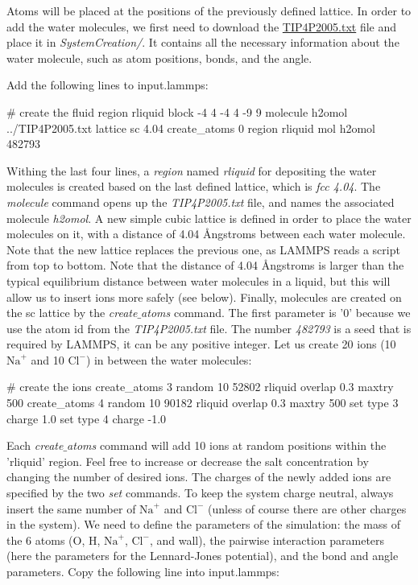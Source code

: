 \noindent Atoms will be placed at the positions of the previously
defined lattice.
In order to add the water molecules, we first need to
download the \href{../../../../../inputs/level2/nanosheared-electrolyte/TIP4P2005.txt}{TIP4P2005.txt}
file and place it in \textit{SystemCreation/}. It contains all the
necessary information about the water molecule, such as
atom positions, bonds, and the angle.

Add the following lines
to input.lammps:

\begin{lcverbatim}
# create the fluid
region rliquid block -4 4 -4 4 -9 9
molecule h2omol ../TIP4P2005.txt
lattice sc 4.04
create_atoms 0 region rliquid mol h2omol 482793
\end{lcverbatim}

\noindent Withing the last four lines, a \textit{region} named \textit{rliquid} for depositing the water molecules is created based
on the last defined lattice, which is \textit{fcc 4.04}. 
The \textit{molecule} command opens up the \textit{TIP4P2005.txt} file, and names
the associated molecule \textit{h2omol}.
A new simple cubic lattice is defined in order to place the water
molecules on it, with a distance of 4.04 Ångstroms between
each water molecule. Note that the new lattice replaces the
previous one, as LAMMPS reads a script from top to bottom.
Note that the distance of 4.04 Ångstroms is larger than the typical
equilibrium distance between water molecules in a liquid,
but this will allow us to insert ions more safely (see below). 
Finally, molecules are created on the sc lattice by the \textit{create$\_$atoms} command. The
first parameter is '0' because we use the atom id from the
\textit{TIP4P2005.txt} file. The number \textit{482793} is a seed that is
required by LAMMPS, it can be any positive integer.
Let us create 20 ions (10 $\text{Na}^+$ and 10 $\text{Cl}^-$)
in between the water molecules:

\begin{lcverbatim}
# create the ions
create_atoms 3 random 10 52802 rliquid overlap 0.3 maxtry 500
create_atoms 4 random 10 90182 rliquid overlap 0.3 maxtry 500
set type 3 charge 1.0
set type 4 charge -1.0
\end{lcverbatim}

\noindent Each \textit{create$\_$atoms} command will add 10 ions at random positions
within the 'rliquid' region. Feel free to increase or decrease the salt
concentration by changing the number of desired ions.
The charges of the newly added ions are specified by the two \textit{set} commands.
To keep the system charge neutral, always insert the same number of 
$\text{Na}^+$ and $\text{Cl}^-$ (unless of course there are other charges in the system).
We need to define the parameters of the simulation: the mass
of the 6 atoms (O, H, $\text{Na}^+$, $\text{Cl}^-$, and wall), the
pairwise interaction parameters (here the parameters for the
Lennard-Jones potential), and the bond and angle parameters.
Copy the following line into input.lammps:

